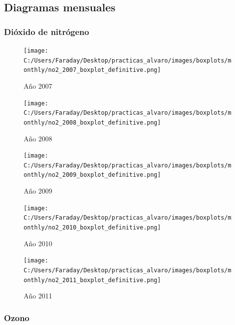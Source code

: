 \documentclass[12pt]{article}
\begin{document}
\newpage

\subsection*{Diagramas mensuales}
%

\subsubsection*{Dióxido de nitrógeno}
%

\begin{figure}[H]
\texttt{[image: C:/Users/Faraday/Desktop/practicas\_alvaro/images/boxplots/monthly/no2\_2007\_boxplot\_definitive.png]}
\caption{Año 2007}
\label{fig:box-ann-1-2007}
\end{figure}

\begin{figure}[H]
\texttt{[image: C:/Users/Faraday/Desktop/practicas\_alvaro/images/boxplots/monthly/no2\_2008\_boxplot\_definitive.png]}
\caption{Año 2008}
\label{fig:box-ann-1-2008}
\end{figure}

\newpage

\begin{figure}[H]
\texttt{[image: C:/Users/Faraday/Desktop/practicas\_alvaro/images/boxplots/monthly/no2\_2009\_boxplot\_definitive.png]}
\caption{Año 2009}
\label{fig:box-ann-1-2009}
\end{figure}

\begin{figure}[H]
\texttt{[image: C:/Users/Faraday/Desktop/practicas\_alvaro/images/boxplots/monthly/no2\_2010\_boxplot\_definitive.png]}
\caption{Año 2010}
\label{fig:box-ann-1-2010}
\end{figure}

\newpage

\begin{figure}[H]
\texttt{[image: C:/Users/Faraday/Desktop/practicas\_alvaro/images/boxplots/monthly/no2\_2011\_boxplot\_definitive.png]}
\caption{Año 2011}
\label{fig:box-ann-1-2011}
\end{figure}

\newpage

\subsubsection*{Ozono}
%
\end{document}
